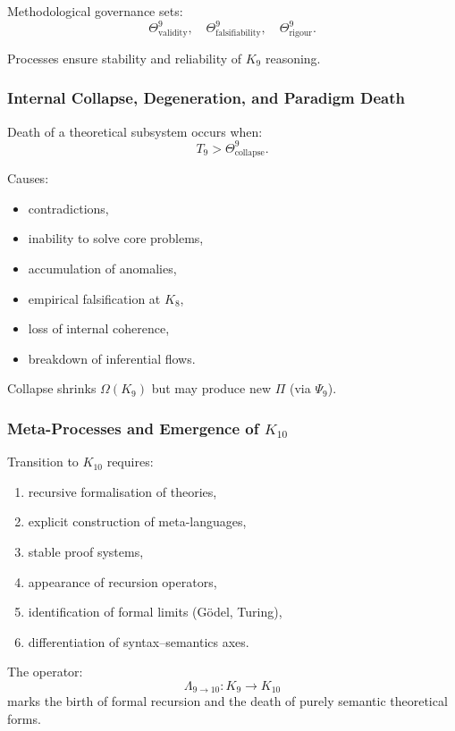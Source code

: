 Methodological governance sets:
\[
\Theta^9_{\text{validity}},\quad 
\Theta^9_{\text{falsifiability}},\quad 
\Theta^9_{\text{rigour}}.
\]

Processes ensure stability and reliability of $K_9$ reasoning.

\subsubsection{Internal Collapse, Degeneration, and Paradigm Death}

Death of a theoretical subsystem occurs when:
\[
T_9 > \Theta^9_{\text{collapse}}.
\]

Causes:
\begin{itemize}
    \item contradictions,
    \item inability to solve core problems,
    \item accumulation of anomalies,
    \item empirical falsification at $K_8$,
    \item loss of internal coherence,
    \item breakdown of inferential flows.
\end{itemize}

Collapse shrinks $\Omega(K_9)$ but may produce new $\Pi$ (via $\Psi_9$).

\subsubsection{Meta-Processes and Emergence of $K_{10}$}

Transition to $K_{10}$ requires:
\begin{enumerate}
    \item recursive formalisation of theories,
    \item explicit construction of meta-languages,
    \item stable proof systems,
    \item appearance of recursion operators,
    \item identification of formal limits (Gödel, Turing),
    \item differentiation of syntax–semantics axes.
\end{enumerate}

The operator:
\[
\Lambda_{9 \to 10}: K_9 \to K_{10}
\]
marks the birth of formal recursion and the death of purely semantic 
theoretical forms.

